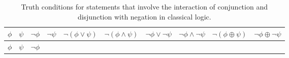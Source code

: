 \documentclass[oneside]{report}
\theoremstyle{definition}
\theoremstyle{definition}
\theoremstyle{definition}
\theoremstyle{remark}
\begin{document}
\begin{longtable}[]{@{}cccccccccc@{}}
\caption{\label{tab:negationtable} Truth conditions for statements that
involve the interaction of conjunction and disjunction with negation in
classical logic.}\tabularnewline
\toprule
\begin{minipage}[b]{0.04\columnwidth}\centering\strut
\(\phi\)\strut
\end{minipage} & \begin{minipage}[b]{0.04\columnwidth}\centering\strut
\(\psi\)\strut
\end{minipage} & \begin{minipage}[b]{0.04\columnwidth}\centering\strut
\(\lnot \phi\)\strut
\end{minipage} & \begin{minipage}[b]{0.04\columnwidth}\centering\strut
\(\lnot \psi\)\strut
\end{minipage} & \begin{minipage}[b]{0.08\columnwidth}\centering\strut
\(\lnot (\phi \lor \psi)\)\strut
\end{minipage} & \begin{minipage}[b]{0.08\columnwidth}\centering\strut
\(\lnot (\phi \land \psi)\)\strut
\end{minipage} & \begin{minipage}[b]{0.08\columnwidth}\centering\strut
\(\lnot \phi \lor \lnot \psi\)\strut
\end{minipage} & \begin{minipage}[b]{0.08\columnwidth}\centering\strut
\(\lnot \phi \land \lnot \psi\)\strut
\end{minipage} & \begin{minipage}[b]{0.09\columnwidth}\centering\strut
\(\lnot (\phi \oplus \psi)\)\strut
\end{minipage} & \begin{minipage}[b]{0.08\columnwidth}\centering\strut
\(\lnot \phi \oplus \lnot \psi\)\strut
\end{minipage}\tabularnewline
\midrule
\endfirsthead
\toprule
\begin{minipage}[b]{0.04\columnwidth}\centering\strut
\(\phi\)\strut
\end{minipage} & \begin{minipage}[b]{0.04\columnwidth}\centering\strut
\(\psi\)\strut
\end{minipage} & \begin{minipage}[b]{0.04\columnwidth}\centering\strut
\(\lnot \phi\)\strut
\end{minipage} & \begin{minipage}[b]{0.04\columnwidth}\centering\strut

\end{minipage}
\end{longtable}
\end{document}

